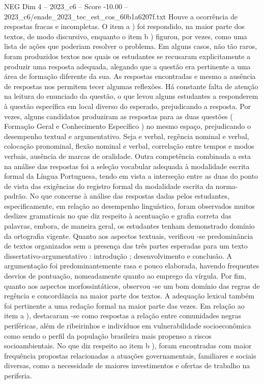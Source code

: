 \begin{textsample}{NEG Dim 4 – 2023\_c6 – Score -10.00 – 2023\_c6/enade\_2023\_tec\_est\_cos\_60b1a6207f.txt}
Houve a ocorrência de respostas fracas e incompletas.
O item a ) foi respondido, na maior parte dos textos, de modo discursivo, enquanto o item b ) figurou, por vezes, como uma lista de ações que poderiam resolver o problema.
Em alguns casos, não tão raros, foram produzidos textos nos quais os estudantes se recusaram explicitamente a produzir uma resposta adequada, alegando que a questão era pertinente a uma área de formação diferente da sua.
As respostas encontradas e mesmo a ausência de respostas nos permitem tecer algumas reflexões.
Há constante falta de atenção na leitura do enunciado da questão, o que levou alguns estudantes a responderem à questão específica em local diverso do esperado, prejudicando a resposta.
Por vezes, alguns candidatos produziram as respostas para as duas questões ( Formação Geral e Conhecimento Específico ) no mesmo espaço, prejudicando o desempenho textual e argumentativo.
Seja e verbal, regência nominal e verbal, colocação pronominal, flexão nominal e verbal, correlação entre tempos e modos verbais, ausência de marcas de oralidade.
Outra competência combinada a esta na análise das respostas foi a seleção vocabular adequada à modalidade escrita formal da Língua Portuguesa, tendo em vista a interseção entre as duas do ponto de vista das exigências do registro formal da modalidade escrita da norma-padrão.
No que concerne à análise das respostas dadas pelos estudantes, especificamente, em relação ao desempenho linguístico, foram observados muitos deslizes gramaticais no que diz respeito à acentuação e grafia correta das palavras, embora, de maneira geral, os estudantes tenham demonstrado domínio da ortografia vigente.
Quanto aos aspectos textuais, verificou -se predominância de textos organizados sem a presença das três partes esperadas para um texto dissertativo-argumentativo : introdução ; desenvolvimento e conclusão.
A argumentação foi predominantemente rasa e pouco elaborada, havendo frequentes desvios de pontuação, nomeadamente quanto ao emprego da vírgula.
Por fim, quanto aos aspectos morfossintáticos, observou -se um bom domínio das regras de regência e concordância na maior parte dos textos.
A adequação lexical também foi pertinente a uma redação formal na maior parte das vezes.
Em relação ao item a ), destacaram -se como respostas a relação entre comunidades negras periféricas, além de ribeirinhos e indivíduos em vulnerabilidade socioeconômica como sendo o perfil da população brasileira mais propenso a riscos socioambientais.
No que diz respeito ao item b ), foram encontradas com maior frequência propostas relacionadas a atuações governamentais, familiares e sociais diversas, como a necessidade de maiores investimentos e ofertas de trabalho na periferia.

\end{textsample}
